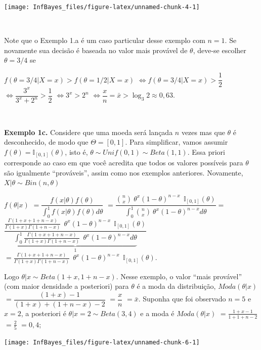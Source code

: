 \documentclass[
]{book}
\begin{document}
\begin{center}\texttt{[image: InfBayes\_files/figure-latex/unnamed-chunk-4-1]} \end{center}

\(~\)

Note que o Exemplo 1.a é um caso particular desse exemplo com \(n=1\). Se novamente sua decisão é baseada no valor mais provável de \(\theta\), deve-se escolher \(\theta=3/4\) se

\(f(\theta=3/4|X=x) > f(\theta=1/2|X=x)\) \(\Longleftrightarrow f(\theta=3/4|X=x) > \dfrac{1}{2}\) \(\Longleftrightarrow \dfrac{3^x}{3^x + 2^n} > \dfrac{1}{2}\) \(\Longleftrightarrow {3^x} > {2^n}\) \(\Longleftrightarrow \dfrac{x}{n} = \bar{x} > \log_3{2}\approx 0,63\).

\(~\)

\textbf{Exemplo 1c.} Considere que uma moeda será lançada \(n\) vezes mas que \(\theta\) é desconhecido, de modo que \(\Theta = [0,1]\). Para simplificar, vamos assumir \(f(\theta)=\mathbb{I}_{[0,1]}(\theta)\), isto é, \(\theta \sim Unif(0,1)\sim Beta(1,1)\). Essa priori corresponde ao caso em que você acredita que todos os valores possíveis para \(\theta\) são igualmente ``prováveis'', assim como nos exemplos anteriores. Novamente, \(X|\theta \sim Bin(n,\theta)\)

\(f(\theta|x)\)
\(=\dfrac{f(x|\theta)f(\theta)}{\displaystyle\int_0^1 f(x|\theta)f(\theta)d\theta}\)
\(=\dfrac{\displaystyle\binom{n}{x}~\theta^x(1-\theta)^{n-x} ~~\mathbb{I}_{[0,1]}(\theta)}{\displaystyle\int_0^1\binom{n}{x}~\theta^x(1-\theta)^{n-x}d\theta}=\) \(\dfrac{\tfrac{\Gamma(1+x+1+n-x)}{\Gamma(1+x)\Gamma(1+n-x)}~~\theta^x(1-\theta)^{n-x}~~\mathbb{I}_{[0,1]}(\theta)}{\underbrace{\displaystyle \int_0^1\tfrac{\Gamma(1+x+1+n-x)}{\Gamma(1+x)\Gamma(1+n-x)}~~\theta^x(1-\theta)^{n-x}d\theta}_{1}}\)
\(=\tfrac{\Gamma(1+x+1+n-x)}{\Gamma(1+x)\Gamma(1+n-x)}~~\theta^x(1-\theta)^{n-x}~~\mathbb{I}_{[0,1]}(\theta)\).

Logo \(\theta|x \sim Beta(1+x,1+n-x)\). Nesse exemplo, o valor ``mais provável'' (com maior densidade a posteriori) para \(\theta\) é a moda da distribuição, \(Moda(\theta|x)\) \(= \dfrac{(1+x)-1}{(1+x)+(1+n-x)-2}\) \(= \dfrac{x}{n}\) \(=\bar{x}\). Suponha que foi observado \(n=5\) e \(x=2\), a posteriori é \(\theta|x=2 \sim Beta(3,4)\) e a moda é \(Moda(\theta|x)\) \(=\frac{1+x-1}{1+1+n-2}\) \(=\frac{2}{5}\) \(=0,4\);

\begin{center}\texttt{[image: InfBayes\_files/figure-latex/unnamed-chunk-6-1]} \end{center}
\end{document}
